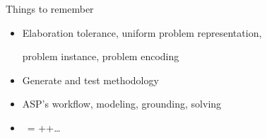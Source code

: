 \begin{frame}{Things to remember}
  \bigskip
  \begin{itemize}
  \item Elaboration tolerance, uniform problem representation,

    problem instance, problem encoding
    \smallskip
  \item Generate and test methodology
    \smallskip
  \item ASP's workflow, modeling, grounding, solving
  \item \clingo\ = \gringo+\clasp\pause+\dots
  \end{itemize}
\end{frame}
%
